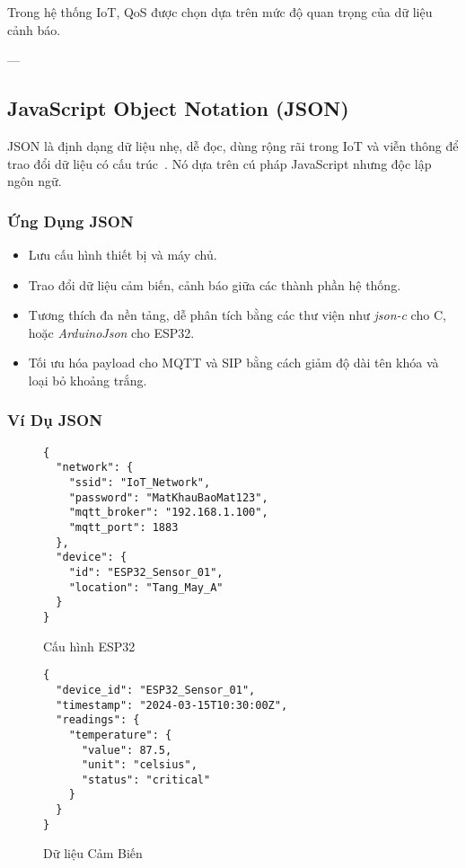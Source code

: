 Trong hệ thống IoT, QoS được chọn dựa trên mức độ quan trọng của dữ liệu cảnh báo.

---

\subsection{JavaScript Object Notation (JSON)}
\label{subsec:json_format}

JSON là định dạng dữ liệu nhẹ, dễ đọc, dùng rộng rãi trong IoT và viễn thông để trao đổi dữ liệu có cấu trúc~\cite{json_rfc8259}. Nó dựa trên cú pháp JavaScript nhưng độc lập ngôn ngữ.

\subsubsection{Ứng Dụng JSON}
\label{subsubsec:json_applications}

\begin{itemize}
\item Lưu cấu hình thiết bị và máy chủ.
\item Trao đổi dữ liệu cảm biến, cảnh báo giữa các thành phần hệ thống.
\item Tương thích đa nền tảng, dễ phân tích bằng các thư viện như \textit{json-c} cho C, hoặc \textit{ArduinoJson} cho ESP32.
\item Tối ưu hóa payload cho MQTT và SIP bằng cách giảm độ dài tên khóa và loại bỏ khoảng trắng.
\end{itemize}

\subsubsection{Ví Dụ JSON}
\label{subsubsec:json_examples}

\begin{figure}[H]
\centering
\begin{verbatim}
{
  "network": {
    "ssid": "IoT_Network",
    "password": "MatKhauBaoMat123",
    "mqtt_broker": "192.168.1.100",
    "mqtt_port": 1883
  },
  "device": {
    "id": "ESP32_Sensor_01",
    "location": "Tang_May_A"
  }
}
\end{verbatim}
\caption{Cấu hình ESP32}
\label{fig:json_esp32_config}
\end{figure}

\begin{figure}[H]
\centering
\begin{verbatim}
{
  "device_id": "ESP32_Sensor_01",
  "timestamp": "2024-03-15T10:30:00Z",
  "readings": {
    "temperature": {
      "value": 87.5,
      "unit": "celsius",
      "status": "critical"
    }
  }
}
\end{verbatim}
\caption{Dữ liệu Cảm Biến}
\label{fig:json_sensor_data}
\end{figure}

